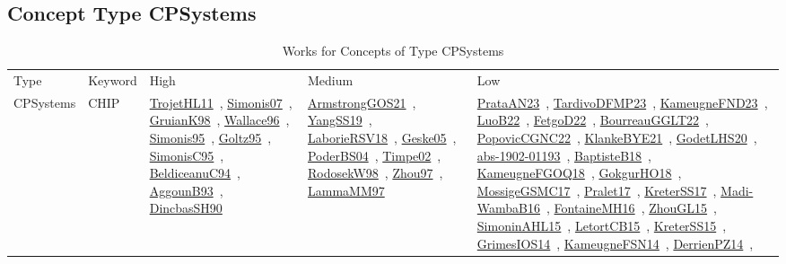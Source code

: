 \clearpage
\subsection{Concept Type CPSystems}
\label{sec:CPSystems}
{\scriptsize
\begin{longtable}{lp{3cm}>{\raggedright\arraybackslash}p{6cm}>{\raggedright\arraybackslash}p{6cm}>{\raggedright\arraybackslash}p{8cm}}
\rowcolor{white}\caption{Works for Concepts of Type CPSystems}\\ \toprule
\rowcolor{white}Type & Keyword & High & Medium & Low\\ \midrule\endhead
\bottomrule
\endfoot
CPSystems & CHIP & \href{works/TrojetHL11.pdf}{TrojetHL11}~\cite{TrojetHL11}, \href{works/Simonis07.pdf}{Simonis07}~\cite{Simonis07}, \href{works/GruianK98.pdf}{GruianK98}~\cite{GruianK98}, \href{works/Wallace96.pdf}{Wallace96}~\cite{Wallace96}, \href{works/Simonis95.pdf}{Simonis95}~\cite{Simonis95}, \href{works/Goltz95.pdf}{Goltz95}~\cite{Goltz95}, \href{works/SimonisC95.pdf}{SimonisC95}~\cite{SimonisC95}, \href{works/BeldiceanuC94.pdf}{BeldiceanuC94}~\cite{BeldiceanuC94}, \href{works/AggounB93.pdf}{AggounB93}~\cite{AggounB93}, \href{works/DincbasSH90.pdf}{DincbasSH90}~\cite{DincbasSH90} & \href{works/ArmstrongGOS21.pdf}{ArmstrongGOS21}~\cite{ArmstrongGOS21}, \href{works/YangSS19.pdf}{YangSS19}~\cite{YangSS19}, \href{works/LaborieRSV18.pdf}{LaborieRSV18}~\cite{LaborieRSV18}, \href{works/Geske05.pdf}{Geske05}~\cite{Geske05}, \href{works/PoderBS04.pdf}{PoderBS04}~\cite{PoderBS04}, \href{works/Timpe02.pdf}{Timpe02}~\cite{Timpe02}, \href{works/RodosekW98.pdf}{RodosekW98}~\cite{RodosekW98}, \href{works/Zhou97.pdf}{Zhou97}~\cite{Zhou97}, \href{works/LammaMM97.pdf}{LammaMM97}~\cite{LammaMM97} & \href{works/PrataAN23.pdf}{PrataAN23}~\cite{PrataAN23}, \href{works/TardivoDFMP23.pdf}{TardivoDFMP23}~\cite{TardivoDFMP23}, \href{works/KameugneFND23.pdf}{KameugneFND23}~\cite{KameugneFND23}, \href{works/LuoB22.pdf}{LuoB22}~\cite{LuoB22}, \href{works/FetgoD22.pdf}{FetgoD22}~\cite{FetgoD22}, \href{works/BourreauGGLT22.pdf}{BourreauGGLT22}~\cite{BourreauGGLT22}, \href{works/PopovicCGNC22.pdf}{PopovicCGNC22}~\cite{PopovicCGNC22}, \href{works/KlankeBYE21.pdf}{KlankeBYE21}~\cite{KlankeBYE21}, \href{works/GodetLHS20.pdf}{GodetLHS20}~\cite{GodetLHS20}, \href{works/abs-1902-01193.pdf}{abs-1902-01193}~\cite{abs-1902-01193}, \href{works/BaptisteB18.pdf}{BaptisteB18}~\cite{BaptisteB18}, \href{works/KameugneFGOQ18.pdf}{KameugneFGOQ18}~\cite{KameugneFGOQ18}, \href{works/GokgurHO18.pdf}{GokgurHO18}~\cite{GokgurHO18}, \href{works/MossigeGSMC17.pdf}{MossigeGSMC17}~\cite{MossigeGSMC17}, \href{works/Pralet17.pdf}{Pralet17}~\cite{Pralet17}, \href{works/KreterSS17.pdf}{KreterSS17}~\cite{KreterSS17}, \href{works/Madi-WambaB16.pdf}{Madi-WambaB16}~\cite{Madi-WambaB16}, \href{works/FontaineMH16.pdf}{FontaineMH16}~\cite{FontaineMH16}, \href{works/ZhouGL15.pdf}{ZhouGL15}~\cite{ZhouGL15}, \href{works/SimoninAHL15.pdf}{SimoninAHL15}~\cite{SimoninAHL15}, \href{works/LetortCB15.pdf}{LetortCB15}~\cite{LetortCB15}, \href{works/KreterSS15.pdf}{KreterSS15}~\cite{KreterSS15}, \href{works/GrimesIOS14.pdf}{GrimesIOS14}~\cite{GrimesIOS14}, \href{works/KameugneFSN14.pdf}{KameugneFSN14}~\cite{KameugneFSN14}, \href{works/DerrienPZ14.pdf}{DerrienPZ14}~\cite{DerrienPZ14}, 
\end{longtable}}

